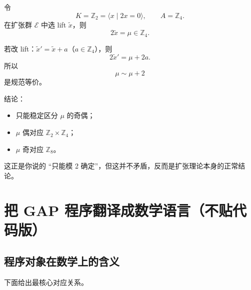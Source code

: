\documentclass[a4paper,fontset=ubuntu,12pt]{ctexart}
\begin{document}
令
\begin{equation}
K=\mathbb{Z}_2=\langle x\mid 2x=0\rangle,\qquad A=\mathbb{Z}_4.
\label{eq:z2-z4}
\end{equation}
在扩张群 $\mathcal{E}$ 中选 lift $\tilde{x}$，则
\begin{equation}
2\tilde{x}=\mu\in \mathbb{Z}_4.
\label{eq:mu-def}
\end{equation}

若改 lift：$\tilde{x}'=\tilde{x}+a$（$a\in\mathbb{Z}_4$），则
\begin{equation}
2\tilde{x}'=\mu+2a.
\label{eq:mu-shift}
\end{equation}
所以
\begin{equation}
\mu\sim \mu+2
\label{eq:mu-equivalence}
\end{equation}
是规范等价。

结论：
\begin{itemize}
\item 只能稳定区分 $\mu$ 的奇偶；
\item $\mu$ 偶对应 $\mathbb{Z}_2\times\mathbb{Z}_4$；
\item $\mu$ 奇对应 $\mathbb{Z}_8$。
\end{itemize}

这正是你说的 ``只能模 2 确定''，但这并不矛盾，反而是扩张理论本身的正常结论。

\section{把 GAP 程序翻译成数学语言（不贴代码版）}
\label{sec:gap-to-math}

\subsection{程序对象在数学上的含义}

下面给出最核心对应关系。
\end{document}
